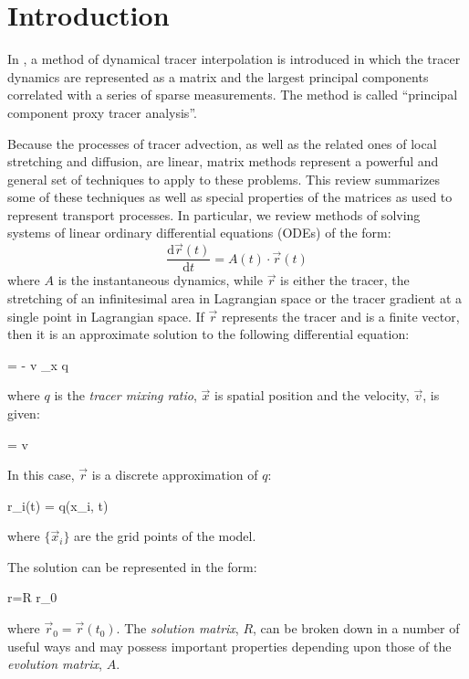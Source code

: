 
\section{Introduction}

In \citet{Mills2018}, a method of dynamical tracer interpolation
is introduced
in which the tracer dynamics are represented as a matrix and the largest
principal components correlated with a series of sparse measurements.
The method is called ``principal component proxy tracer analysis''.

Because the processes of tracer advection, as well as the related ones
of local stretching and diffusion, are linear, 
matrix methods represent a powerful and
general set of techniques to apply to these problems.
This review summarizes some of these techniques as well as special properties
of the matrices as used to represent transport processes.  In particular, 
we review methods of solving systems of linear ordinary differential
equations (ODEs) of the form:
\begin{equation}
\frac{\mathrm d \vec r(t)}{\mathrm d t} = A(t) \cdot \vec r(t)
\end{equation}
where $A$ is the instantaneous dynamics, while $\vec r$ is either the tracer,
the stretching of an infinitesimal area in Lagrangian space or the tracer gradient at a single point
in Lagrangian space. 
If $\vec r$ represents the tracer and is a finite vector,
then it is an approximate solution to the following differential equation:
\begin{eqnl}
	 = - \vec v \cdot \nabla_{\vec x} q
\end{eqnl}
where $q$ is the {\it tracer mixing ratio}, $\vec x$ is spatial position and the velocity, $\vec v$, is given:
\begin{eqnl}
	 = \vec v
\end{eqnl}
In this case, $\vec r$ is a discrete approximation of $q$:
\begin{eqnl}
	r_i(t) = q(\vec x_i, t)
\end{eqnl}
where $\lbrace \vec x_i \rbrace$ are the grid points of the model.

The solution can be represented in the form:
\begin{eqnl}
	\vec r=R \cdot \vec r_0
\end{eqnl}
where $\vec r_0=\vec r(t_0)$.
The {\it solution matrix}, $R$, can be broken down in a number of useful ways
and may possess important properties depending upon those of
the {\it evolution matrix}, $A$.

